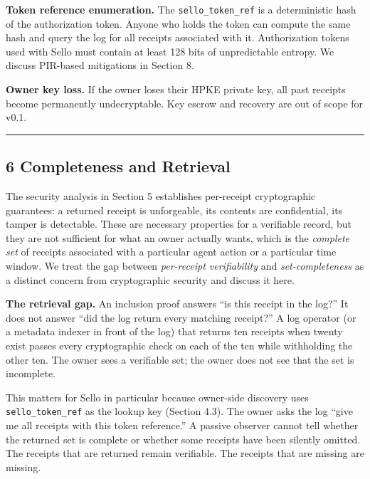 \documentclass[
  11pt,
]{article}
\begin{document}
\textbf{Token reference enumeration.} The \texttt{sello\_token\_ref} is
a deterministic hash of the authorization token. Anyone who holds the
token can compute the same hash and query the log for all receipts
associated with it. Authorization tokens used with Sello must contain at
least 128 bits of unpredictable entropy. We discuss PIR-based
mitigations in Section 8.

\textbf{Owner key loss.} If the owner loses their HPKE private key, all
past receipts become permanently undecryptable. Key escrow and recovery
are out of scope for v0.1.

\begin{center}\rule{0.5\linewidth}{0.5pt}\end{center}

\hypertarget{completeness-and-retrieval}{%
\subsection{6 Completeness and
Retrieval}\label{completeness-and-retrieval}}

The security analysis in Section 5 establishes per-receipt cryptographic
guarantees: a returned receipt is unforgeable, its contents are
confidential, its tamper is detectable. These are necessary properties
for a verifiable record, but they are not sufficient for what an owner
actually wants, which is the \emph{complete set} of receipts associated
with a particular agent action or a particular time window. We treat the
gap between \emph{per-receipt verifiability} and \emph{set-completeness}
as a distinct concern from cryptographic security and discuss it here.

\textbf{The retrieval gap.} An inclusion proof answers ``is this receipt
in the log?'' It does not answer ``did the log return every matching
receipt?'' A log operator (or a metadata indexer in front of the log)
that returns ten receipts when twenty exist passes every cryptographic
check on each of the ten while withholding the other ten. The owner sees
a verifiable set; the owner does not see that the set is incomplete.

This matters for Sello in particular because owner-side discovery uses
\texttt{sello\_token\_ref} as the lookup key (Section 4.3). The owner
asks the log ``give me all receipts with this token reference.'' A
passive observer cannot tell whether the returned set is complete or
whether some receipts have been silently omitted. The receipts that are
returned remain verifiable. The receipts that are missing are missing.
\end{document}
